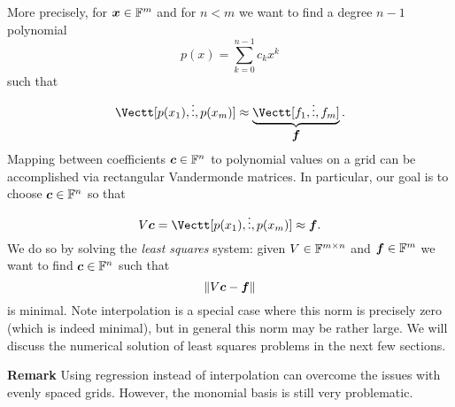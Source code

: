 More precisely, for $\bm{{\mbox{\boldmath$x$\unboldmath}}} \in {\mathbb F}^m$ and for $n < m$ we want to find a degree $n-1$ polynomial
\[
p(x) = \ensuremath{\sum}_{k=0}^{n-1} c_k x^k
\]
such that
\[
\Vectt[p(x_1), \ensuremath{\vdots}, p(x_m)] \ensuremath{\approx} \underbrace{\Vectt[f_1,\ensuremath{\vdots},f_m]}_{\ensuremath{\bm{\f}}}.
\]
Mapping between coefficients $\bm{{\mbox{\boldmath$c$\unboldmath}}} \in {\mathbb F}^n$ to polynomial values on a grid can be accomplished  via rectangular Vandermonde matrices. In particular, our goal is to choose $\bm{{\mbox{\boldmath$c$\unboldmath}}} \in {\mathbb F}^n$ so that
\[
V \ensuremath{\bm{\c}}  = \Vectt[p(x_1), \ensuremath{\vdots}, p(x_m)] \ensuremath{\approx} \ensuremath{\bm{\f}}.
\]
We do so by solving the \emph{least squares} system: given $V \in {\mathbb F}^{m \times n}$ and $\bm{{\mbox{\boldmath$f$\unboldmath}}} \in {\mathbb F}^m$ we want to find $\bm{{\mbox{\boldmath$c$\unboldmath}}} \in {\mathbb F}^n$ such that
\[
\| V \bm{{\mbox{\boldmath$c$\unboldmath}}} - \bm{{\mbox{\boldmath$f$\unboldmath}}} \|
\]
is minimal. Note interpolation is a special case where this norm is precisely zero (which is indeed minimal), but in general this norm may be rather large.   We will discuss the numerical solution of least squares problems in the next few sections.

\textbf{Remark} Using regression instead of interpolation can overcome the issues with evenly spaced grids. However, the monomial basis is still very problematic.



